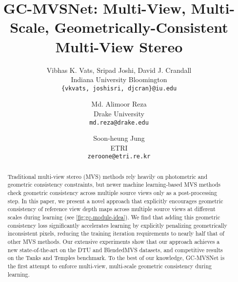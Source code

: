 \documentclass[10pt,twocolumn,letterpaper]{article}
\begin{document}
\title{GC-MVSNet: Multi-View, Multi-Scale, Geometrically-Consistent \\
  Multi-View Stereo}

\author{Vibhas K. Vats, Sripad Joshi, David J. Crandall\\
Indiana University Bloomington\\
{\tt\small \{vkvats, joshisri, djcran\}@iu.edu}
\and
Md. Alimoor Reza\\
Drake University\\
{\tt\small md.reza@drake.edu}
\and 
Soon-heung Jung\\
ETRI\\
{\tt\small zeroone@etri.re.kr}
}

\newcommand\myfigure{\vspace{-25pt}
  \texttt{[image: figures/idea\_digram.pdf]}\\\refstepcounter{figure}\normalfont Figure~\thefigure: Our
  multi-view, multi-scale geometric consistency checking
  process. During training, the geometric consistency of the estimated
  depth map is explicitly modeled across multiple source views. This allows the model to more quickly and accurately learn about geometric consistency,
  allowing the trained model to produce better reconstructions during inference.
  \label{fig:gc-module-idea}\\
}

\makeatletter
\let\@oldmaketitle\@maketitle \renewcommand{\@maketitle}{\@oldmaketitle
    \myfigure}
\makeatother


\maketitle






\begin{abstract}
\vspace{-10pt}
Traditional multi-view stereo (MVS) methods rely heavily on
photometric and geometric consistency constraints, but
newer machine learning-based MVS methods check geometric
consistency across multiple source views only as a
post-processing step. In this paper, we present a novel 
approach that explicitly encourages
geometric consistency of reference view depth maps across
multiple source views at different scales during learning (see \cref{fig:gc-module-idea}).
We find that adding this geometric consistency loss
significantly accelerates learning by explicitly
penalizing geometrically inconsistent pixels,  
reducing the training iteration requirements to nearly half
that of other MVS methods.
Our extensive experiments show that our approach 
achieves a new state-of-the-art on the DTU and
BlendedMVS datasets, and competitive results on the Tanks and
Temples benchmark. To the best of our knowledge,
GC-MVSNet is the first attempt to enforce multi-view, multi-scale 
geometric consistency during learning.
\end{abstract}
\end{document}
